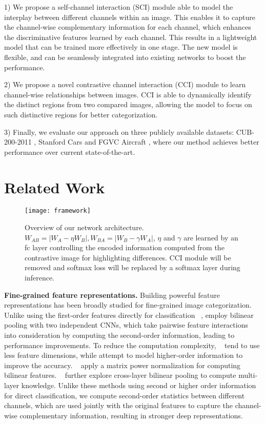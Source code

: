 \documentclass[letterpaper]{article} \usepackage{aaai20}  \usepackage{times}  \usepackage{helvet} \usepackage{courier}  \usepackage[hyphens]{url}  \usepackage{graphicx} \urlstyle{rm} \def\UrlFont{\rm}  \usepackage{graphicx}  \frenchspacing  \setlength{\pdfpagewidth}{8.5in}  \setlength{\pdfpageheight}{11in}  \usepackage{amsmath,amssymb}
\begin{document}
1) We propose a self-channel interaction (SCI) module able to model the interplay between different channels within an image. This enables it to capture the channel-wise complementary  information for each channel, which enhances the discriminative features learned by each channel. This results in a lightweight model that can be trained more effectively in one stage. The new model is flexible, and can be seamlessly integrated into existing networks to boost the performance.

2) We propose a novel contrastive channel interaction (CCI) module to learn channel-wise relationships between images. CCI is able to dynamically identify the distinct regions from two compared images, allowing the model to focus on such distinctive regions for better categorization.

3) Finally, we evaluate our approach on three publicly available datasets: CUB-200-2011 \cite{wah2011caltech}, Stanford Cars \cite{krause20133d} and FGVC Aircraft \cite{DBLP:journals/corr/MajiRKBV13}, where our method achieves better performance over current state-of-the-art.

\section{Related Work}
\begin{figure*}
\begin{center}
\texttt{[image: framework]}
\end{center}
\caption{
Overview of our network architecture. $W_{AB} = |W_A - \eta W_B|, W_{BA} = |W_B - \gamma W_A|$, $\eta$ and $\gamma$ are learned by an fc layer controlling the encoded information computed from the contrastive image for highlighting differences. CCI module will be removed and softmax loss will be replaced by a softmax layer during inference.}
\label{approach:whole}
\end{figure*}

\textbf{Fine-grained feature representations.} Building powerful feature representations has been broadly studied for fine-grained image categorization.
Unlike using the first-order features directly for classification ~\cite{zhang2014part,DBLP:journals/pr/WeiXWS18},  \cite{lin2015bilinear} employ bilinear pooling with two independent CNNs, which take pairwise feature interactions into consideration by computing the second-order information, leading  to performance improvements.
To reduce the computation complexity,  ~\cite{DBLP:conf/cvpr/GaoBZD16,DBLP:conf/cvpr/KongF17} tend to use less feature dimensions,
while \cite{DBLP:conf/cvpr/CuiZWLLB17} attempt to model higher-order information to improve the accuracy. ~\cite{DBLP:conf/cvpr/WangLZ17,DBLP:conf/cvpr/LiXWG18} apply a matrix power normalization for computing bilinear features.
~\cite{yu2018hierarchical} further explore cross-layer bilinear pooling to compute multi-layer knowledge.
Unlike these methods using second or higher order information for direct classification, we compute second-order statistics between different channels, which are used jointly with the original features to capture the channel-wise complementary information, resulting in stronger deep representations.
\end{document}
